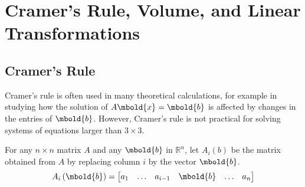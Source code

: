\documentclass[12pt letter]{report}
\begin{document}
\chapter{Cramer's Rule, Volume, and Linear Transformations}

\section{Cramer's Rule}


Cramer's rule is often used in many theoretical calculations, for example in studying how the solution of $A\mbold{x} =
  \mbold{b}$ is affected by changes in the entries of $\mbold{b}$. However, Cramer's rule is not practical for solving
systems of equations larger than $3\times 3$.

For any $n\times n$ matrix $A$ and any $\mbold{b}$ in $\mathbb{R}^{n}$, let $A_i \left( b \right)$ be the matrix
obtained from $A$ by replacing column $i$ by the vector $\mbold{b}$.
\[
  A_i \left( \mbold{b} \right)  = \begin{bmatrix}  a_1& \ldots& a_{i-1}&  \mbold{b}& \ldots& a_n  \end{bmatrix}
\]

\end{document}
